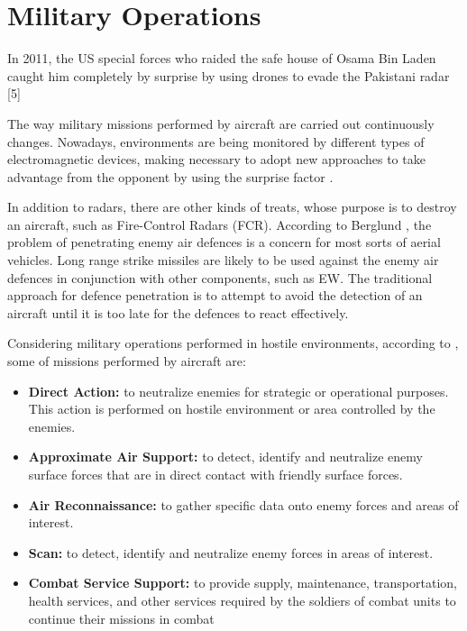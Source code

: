 \section{Military Operations}

In 2011, the US special forces who raided the safe house of Osama Bin Laden caught him completely by surprise by using drones to evade the Pakistani radar [5]

The way military missions performed by aircraft are carried out continuously changes. Nowadays, environments are being monitored by different types of electromagnetic devices, making necessary to adopt new approaches to take advantage from the opponent by using the surprise factor \cite{exercito_2009, kacena1995}. 

In addition to radars, there are other kinds of treats, whose purpose is to destroy an aircraft, such as Fire-Control Radars (FCR). According to Berglund \cite{berglund_2001}, the problem of penetrating enemy air defences is a concern for most sorts of aerial vehicles. Long range strike missiles are likely to be used against the enemy air defences in conjunction with other components, such as EW. The traditional approach for defence penetration is to attempt to avoid the detection of an aircraft until it is too late for the defences to react effectively.

Considering military operations performed in hostile environments, according to \citeauthor{aeronautica_2012} \cite{aeronautica_2012}, some of missions performed by aircraft are:
\begin{itemize}
    \item \textbf{Direct Action:} to neutralize enemies for strategic or operational purposes. This action is performed on hostile environment or area controlled by the enemies. 
    \item \textbf{Approximate Air Support:} to detect, identify and neutralize enemy surface forces that are in direct contact with friendly surface forces.
    \item \textbf{Air Reconnaissance:} to gather specific data onto enemy forces and areas of interest.
    \item \textbf{Scan:} to detect, identify and neutralize enemy forces in areas of interest.
    \item \textbf{Combat Service Support:}  to provide supply, maintenance, transportation, health services, and other services required by the soldiers of combat units to continue their missions in combat
\end{itemize}

